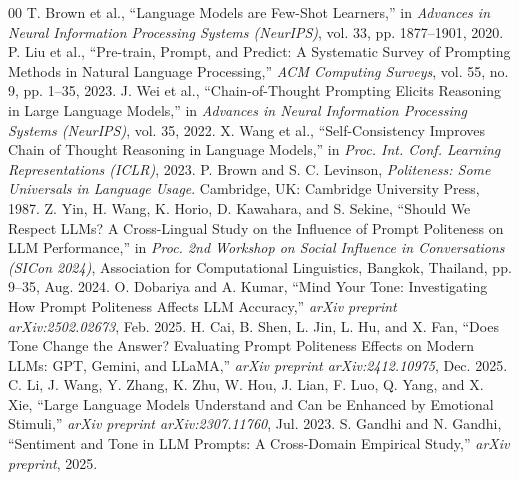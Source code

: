 \documentclass[conference]{IEEEtran}
\begin{document}
\begin{thebibliography}{00}
 T. Brown et al., ``Language Models are Few-Shot Learners,'' in \textit{Advances in Neural Information Processing Systems (NeurIPS)}, vol. 33, pp. 1877--1901, 2020.
 P. Liu et al., ``Pre-train, Prompt, and Predict: A Systematic Survey of Prompting Methods in Natural Language Processing,'' \textit{ACM Computing Surveys}, vol. 55, no. 9, pp. 1--35, 2023.
 J. Wei et al., ``Chain-of-Thought Prompting Elicits Reasoning in Large Language Models,'' in \textit{Advances in Neural Information Processing Systems (NeurIPS)}, vol. 35, 2022.
 X. Wang et al., ``Self-Consistency Improves Chain of Thought Reasoning in Language Models,'' in \textit{Proc. Int. Conf. Learning Representations (ICLR)}, 2023.
 P. Brown and S. C. Levinson, \textit{Politeness: Some Universals in Language Usage}. Cambridge, UK: Cambridge University Press, 1987.
 Z. Yin, H. Wang, K. Horio, D. Kawahara, and S. Sekine, ``Should We Respect LLMs? A Cross-Lingual Study on the Influence of Prompt Politeness on LLM Performance,'' in \textit{Proc. 2nd Workshop on Social Influence in Conversations (SICon 2024)}, Association for Computational Linguistics, Bangkok, Thailand, pp. 9--35, Aug. 2024.
 O. Dobariya and A. Kumar, ``Mind Your Tone: Investigating How Prompt Politeness Affects LLM Accuracy,'' \textit{arXiv preprint arXiv:2502.02673}, Feb. 2025.
 H. Cai, B. Shen, L. Jin, L. Hu, and X. Fan, ``Does Tone Change the Answer? Evaluating Prompt Politeness Effects on Modern LLMs: GPT, Gemini, and LLaMA,'' \textit{arXiv preprint arXiv:2412.10975}, Dec. 2025.
 C. Li, J. Wang, Y. Zhang, K. Zhu, W. Hou, J. Lian, F. Luo, Q. Yang, and X. Xie, ``Large Language Models Understand and Can be Enhanced by Emotional Stimuli,'' \textit{arXiv preprint arXiv:2307.11760}, Jul. 2023.
 S. Gandhi and N. Gandhi, ``Sentiment and Tone in LLM Prompts: A Cross-Domain Empirical Study,'' \textit{arXiv preprint}, 2025.
\end{thebibliography}
\end{document}
